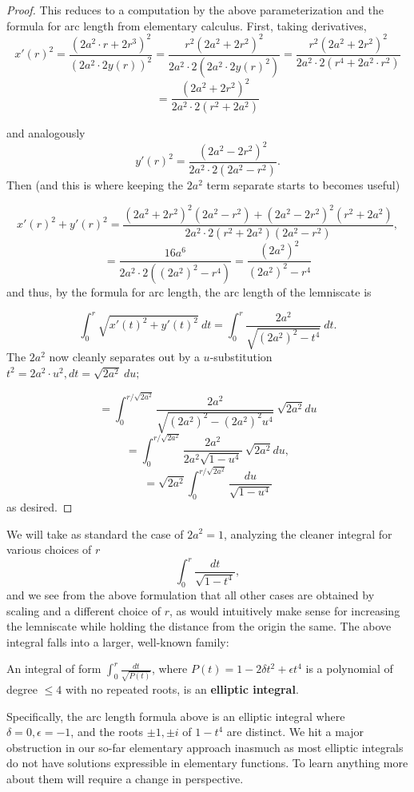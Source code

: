 \begin{proof}
This reduces to a computation by the above parameterization and the formula for arc length from elementary calculus. First, taking derivatives,
\[x'(r)^2 = \frac{(2a^2 \cdot r + 2 r^3)^2}{(2a^2 \cdot 2 y(r))^2} = \frac{r^2 (2a^2 + 2r^2)^2}{2a^2 \cdot 2 (2a^2 \cdot 2 y(r)^2)} =  \frac{r^2 (2a^2 + 2r^2)^2}{2a^2 \cdot 2 (r^4 + 2a^2 \cdot r^2) } \]
\[ = \frac{(2a^2 + 2r^2)^2}{2a^2 \cdot 2(r^2 + 2a^2) } \]

and analogously
\[y'(r)^2 =  \frac{(2a^2 - 2r^2)^2}{2a^2 \cdot 2(2a^2 - r^2) } .\]
Then (and this is where keeping the $2a^2$ term separate starts to becomes useful)

\[ x'(r)^2 + y'(r)^2 = \frac{(2a^2 + 2r^2)^2  (2a^2 - r^2) +  (2a^2 - 2r^2)^2 (r^2 + 2a^2)} {2a^2 \cdot 2 (r^2 + 2a^2) (2a^2 - r^2)}, \]
\[ =  \frac{16 a^6} {2a^2 \cdot 2 ((2a^2)^2 - r^4) }  =  \frac{(2a^2)^2} {(2a^2)^2 - r^4 }\]
and thus, by the formula for arc length, the arc length of the lemniscate is

\[\int_0^r \sqrt{x'(t)^2 + y'(t)^2}  \ dt = \int_0^r \frac{2a^2} { \sqrt{(2a^2)^2 - t^4 }}  \  dt .\]
The $2a^2$ now cleanly separates out by a $u$-substitution $t^2 = 2a^2 \cdot u^2, dt = \sqrt{2a^2}    \ du;$

\[ = \int_0^{r / \sqrt{2a^2} }  \frac{2a^2} { \sqrt{(2a^2)^2 - (2a^2)^2 u^4}}  \  \sqrt{2a^2} du  \]
\[= \int_0^{r / \sqrt{2a^2} }  \frac{2a^2} { 2a^2 \sqrt{1 -  u^4}}  \  \sqrt{2a^2} du   ,\]
\[ =  \sqrt{2a^2} \int_0^{r / \sqrt{2a^2} }  \frac{du} {\sqrt{1 -  u^4}}\]
as desired.
\end{proof}
 We will take as standard the case of $2a^2 = 1$, analyzing the cleaner integral for various choices of $r$
\[\int_0^r \frac{dt}{\sqrt{1 - t^4}},\]
and we see from the above formulation that all other cases are obtained by scaling and a different choice of $r$, as would intuitively make sense for increasing the lemniscate while holding the distance from the origin the same. The above integral falls into a larger, well-known family:

\begin{definition}
    An integral of form $\int_0^r \frac{dt}{\sqrt{P(t)}}$, where $P(t) = 1 - 2 \delta t^2 + \epsilon t^4 $ is a polynomial of degree $\leq 4$ with no repeated roots, is an \textbf{elliptic integral}.
\end{definition}

Specifically, the arc length formula above is an elliptic integral where $\delta = 0, \epsilon = -1$, and the roots $\pm 1, \pm i$ of $1 - t^4$ are distinct. We hit a major obstruction in our so-far elementary approach inasmuch as most elliptic integrals do not have solutions expressible in elementary functions. To learn anything more about them will require a change in perspective.


